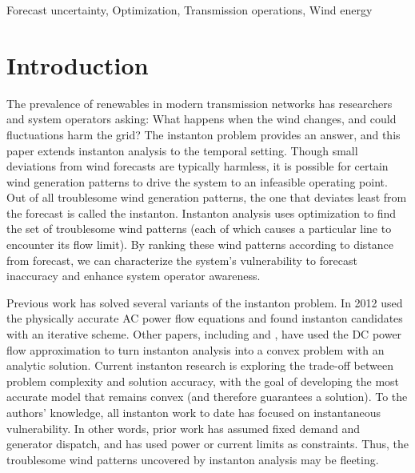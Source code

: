 \documentclass[conference]{IEEEtran}
\begin{document}
\begin{IEEEkeywords}
Forecast uncertainty, Optimization, Transmission operations, Wind energy
\end{IEEEkeywords}


\section{Introduction}

The prevalence of renewables in modern transmission networks has researchers and system operators asking: What happens when the wind changes, and could fluctuations harm the grid? The instanton problem provides an answer, and this paper extends instanton analysis to the temporal setting. Though small deviations from wind forecasts are typically harmless, it is possible for certain wind generation patterns to drive the system to an infeasible operating point. Out of all troublesome wind generation patterns, the one that deviates least from the forecast is called the instanton. Instanton analysis uses optimization to find the set of troublesome wind patterns (each of which causes a particular line to encounter its flow limit). By ranking these wind patterns according to distance from forecast, we can characterize the system's vulnerability to forecast inaccuracy and enhance system operator awareness.

Previous work has solved several variants of the instanton problem. In 2012 \cite{baghsorkhi2012} used the physically accurate AC power flow equations and found instanton candidates with an iterative scheme. Other papers, including \cite{chertkov2011} and \cite{chertkov2011a}, have used the DC power flow approximation to turn instanton analysis into a convex problem with an analytic solution. Current instanton research is exploring the trade-off between problem complexity and solution accuracy, with the goal of developing the most accurate model that remains convex (and therefore guarantees a solution). To the authors' knowledge, all instanton work to date has focused on instantaneous vulnerability. In other words, prior work has assumed fixed demand and generator dispatch, and has used power or current limits as constraints. Thus, the troublesome wind patterns uncovered by instanton analysis may be fleeting.
\end{document}
